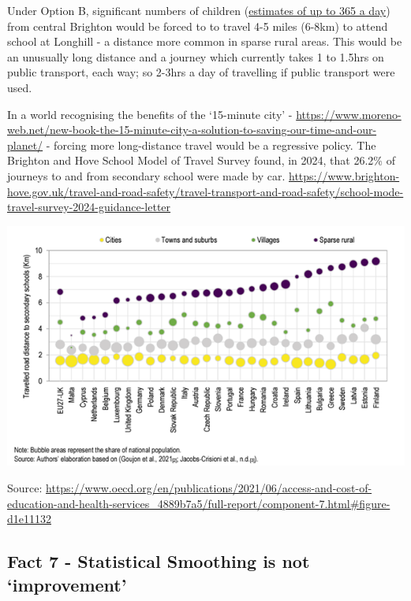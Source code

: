 \documentclass[
  letterpaper,
  DIV=11,
  numbers=noendperiod]{scrartcl}
\begin{document}
Under Option B, significant numbers of children
(\href{https://adamdennett.github.io/BH_Schools_2/schools_wk3.html\#option-b-and-the-inevitable-mass-transfer-of-children-from-central-brighton-to-the-east}{estimates
of up to 365 a day}) from central Brighton would be forced to to travel
4-5 miles (6-8km) to attend school at Longhill - a distance more common
in sparse rural areas. This would be an unusually long distance and a
journey which currently takes 1 to 1.5hrs on public transport, each way;
so 2-3hrs a day of travelling if public transport were used.

In a world recognising the benefits of the `15-minute city' -
\url{https://www.moreno-web.net/new-book-the-15-minute-city-a-solution-to-saving-our-time-and-our-planet/}
- forcing more long-distance travel would be a regressive policy. The
Brighton and Hove School Model of Travel Survey found, in 2024, that
26.2\% of journeys to and from secondary school were made by car.
\url{https://www.brighton-hove.gov.uk/travel-and-road-safety/travel-transport-and-road-safety/school-mode-travel-survey-2024-guidance-letter}

\includegraphics{images/distance_europe.png}

Source:
\url{https://www.oecd.org/en/publications/2021/06/access-and-cost-of-education-and-health-services_4889b7a5/full-report/component-7.html\#figure-d1e11132}

\hypertarget{fact-7---statistical-smoothing-is-not-improvement}{%
\subsection{Fact 7 - Statistical Smoothing is not
`improvement'}\label{fact-7---statistical-smoothing-is-not-improvement}}
\end{document}
